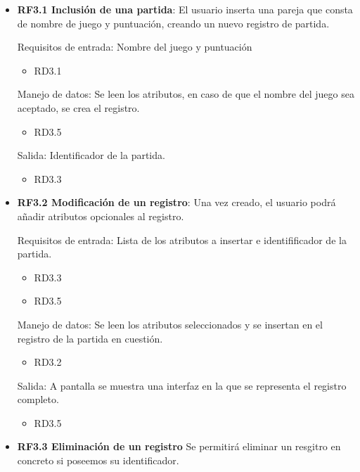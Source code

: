 \begin{itemize}

	\item \textbf{RF3.1 Inclusión de una partida}: El usuario inserta una pareja que consta de nombre de juego y puntuación, creando un nuevo registro de partida.

	Requisitos de entrada: Nombre del juego y puntuación
	\begin{itemize}
		\item RD3.1
	\end{itemize}

	Manejo de datos: Se leen los atributos, en caso de que el nombre del juego sea aceptado, se crea el registro.
	\begin{itemize}
		\item RD3.5
	\end{itemize}

	Salida: Identificador de la partida.
	\begin{itemize}
		\item RD3.3
	\end{itemize}

	\item \textbf{RF3.2 Modificación de un registro}: Una vez creado, el usuario podrá añadir atributos opcionales al registro.

	Requisitos de entrada: Lista de los atributos a insertar e identifificador de la partida.\\
	\begin{itemize}
		\item RD3.3
		\item RD3.5
	\end{itemize}

	Manejo de datos: Se leen los atributos seleccionados y se insertan en el registro de la partida en cuestión. \\
	\begin{itemize}
		\item RD3.2
	\end{itemize}

	Salida: A pantalla se muestra una interfaz en la que se representa el registro completo.
	\begin{itemize}
		\item RD3.5
	\end{itemize}

	\item \textbf{RF3.3 Eliminación de un registro} Se permitirá eliminar un resgitro en concreto si poseemos su identificador.


\end{itemize}
